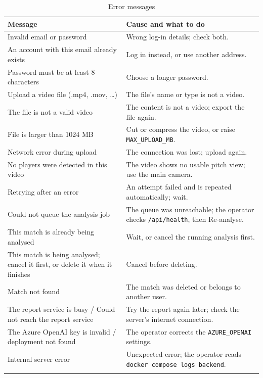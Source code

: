 \begin{longtable}{|p{}|p{}|}
	\hline
	\textbf{Message} & \textbf{Cause and what to do} \\
	\hline
	\endhead
	Invalid email or password & Wrong log-in details; check both. \\
	\hline
	An account with this email already exists & Log in instead, or use another address. \\
	\hline
	Password must be at least 8 characters & Choose a longer password. \\
	\hline
	Upload a video file (.mp4, .mov, \dots) & The file's name or type is not a video. \\
	\hline
	The file is not a valid video & The content is not a video; export the file again. \\
	\hline
	File is larger than 1024 MB & Cut or compress the video, or raise \texttt{MAX\_\allowbreak{}UPLOAD\_\allowbreak{}MB}. \\
	\hline
	Network error during upload & The connection was lost; upload again. \\
	\hline
	No players were detected in this video & The video shows no usable pitch view; use the main camera. \\
	\hline
	Retrying after an error & An attempt failed and is repeated automatically; wait. \\
	\hline
	Could not queue the analysis job & The queue was unreachable; the operator checks \texttt{/api/health}, then Re-analyse. \\
	\hline
	This match is already being analysed & Wait, or cancel the running analysis first. \\
	\hline
	This match is being analysed; cancel it first, or delete it when it finishes & Cancel before deleting. \\
	\hline
	Match not found & The match was deleted or belongs to another user. \\
	\hline
	The report service is busy / Could not reach the report service & Try the report again later; check the server's internet connection. \\
	\hline
	The Azure OpenAI key is invalid / deployment not found & The operator corrects the \texttt{AZURE\_OPENAI} settings. \\
	\hline
	Internal server error & Unexpected error; the operator reads \texttt{docker compose logs backend}. \\
	\hline
	\caption{Error messages}
	\label{tab:errors}
\end{longtable}

